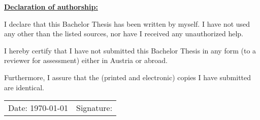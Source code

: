 \newpage

\vspace*{\fill}
\begin{flushleft}
    \textbf{\uline{Declaration of authorship:}}
\end{flushleft}

I declare that this Bachelor Thesis has been written by myself.
I have not used any other than the listed sources, nor have I received any unauthorized help.

\vspace{2ex}

I hereby certify that I have not submitted this Bachelor Thesis in any form (to a reviewer for assessment) either in Austria or abroad.

\vspace{2ex}

Furthermore, I assure that the (printed and electronic) copies I have submitted are identical.

\vspace{10mm}

\noindent\begin{tabular}{p{}p{}}
             Date: \today & Signature: \hspace{5cm} \\
\end{tabular}

